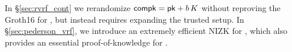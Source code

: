 In \S\ref{sec:rvrf_cont} we rerandomize $\mathsf{compk} = \mathsf{pk} + b \, K$
without reproving the Groth16 for \Rring, but instead requires
expanding the trusted setup.
%
In \S\ref{sec:pederson_vrf}, we introduce an extremely efficient NIZK
for \Reval, which also provides an essential proof-of-knowledge for \compk.





\endinput





Ring VRFs are firstly ring signatures broadly interpreted, in that they
prove an involved public key lies inside some commitment \comring to
the plausible signer set, known as the ring.
Anyone could compute \comring from this set of public keys.
%
At the same time, ring VRFs prove correct output of a PRF keyed by
the signer's actual secret key, and evaluated on a supplied message \msg,
which then links ring VRF signatures on the same \msg.

\smallskip
